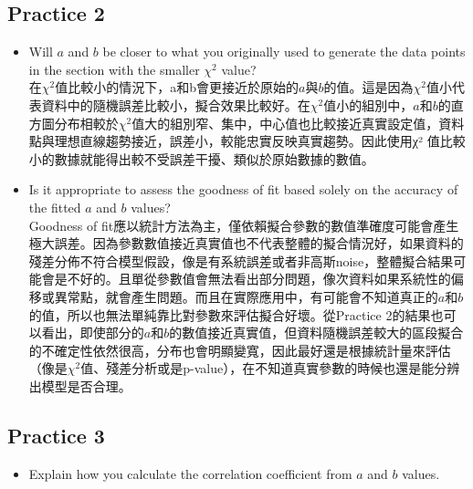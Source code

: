 \documentclass[12pt,a4paper]{article}
\begin{document}
\begin{CJK}{UTF8}{bkai}
\begin{itemize}
\end{itemize}

\clearpage
\subsection{Practice 2}
\hfill

\begin{itemize}
    \item Will $a$ and $b$ be closer to what you originally used to generate the data points in the section with the smaller $\chi^2$ value?\\
    在$\chi^2$值比較小的情況下，a和b會更接近於原始的$a$與$b$的值。這是因為$\chi^2$值小代表資料中的隨機誤差比較小，擬合效果比較好。在$\chi^2$值小的組別中，$a$和$b$的直方圖分布相較於$\chi^2$值大的組別窄、集中，中心值也比較接近真實設定值，資料點與理想直線趨勢接近，誤差小，較能忠實反映真實趨勢。因此使用χ² 值比較小的數據就能得出較不受誤差干擾、類似於原始數據的數值。

    \item Is it appropriate to assess the goodness of fit based solely on the accuracy of the fitted $a$ and $b$ values?\\
    Goodness of fit應以統計方法為主，僅依賴擬合參數的數值準確度可能會產生極大誤差。因為參數數值接近真實值也不代表整體的擬合情況好，如果資料的殘差分佈不符合模型假設，像是有系統誤差或者非高斯noise，整體擬合結果可能會是不好的。且單從參數值會無法看出部分問題，像次資料如果系統性的偏移或異常點，就會產生問題。而且在實際應用中，有可能會不知道真正的$a$和$b$的值，所以也無法單純靠比對參數來評估擬合好壞。從Practice 2的結果也可以看出，即使部分的$a$和$b$的數值接近真實值，但資料隨機誤差較大的區段擬合的不確定性依然很高，分布也會明顯變寬，因此最好還是根據統計量來評估（像是$\chi^2$值、殘差分析或是p-value），在不知道真實參數的時候也還是能分辨出模型是否合理。
\end{itemize}


\subsection{Practice 3}
\hfill

\begin{itemize}
    \item Explain how you calculate the correlation coefficient from $a$ and $b$ values.


\end{itemize}
\end{CJK}
\end{document}
